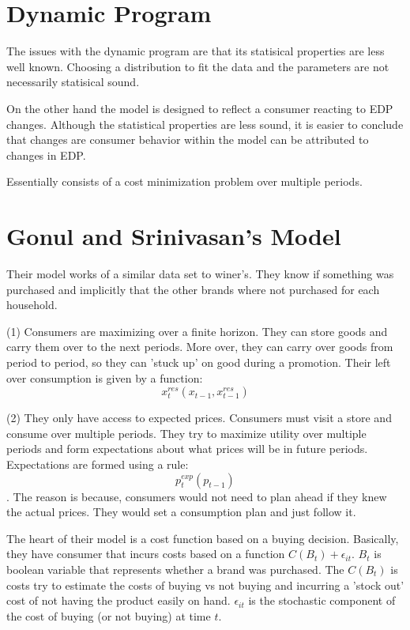 \documentclass{article}
\begin{document}
\section{Dynamic Program}

The issues with the dynamic program are that its statisical properties are less well known. Choosing a distribution to fit the data and the parameters are not necessarily statisical sound.

On the other hand the model is designed to reflect a consumer reacting to EDP changes. Although the statistical properties are less sound, it is easier to conclude that changes are consumer behavior within the model can be attributed to changes in EDP.

Essentially consists of a cost minimization problem over multiple periods.


\section{Gonul and Srinivasan's Model}

Their model works of a similar data set to winer's. They know if something was purchased and implicitly that the other brands where not purchased for each household.

(1) Consumers are maximizing over a finite horizon. They can store goods and carry them over to the next periods. More over, they can carry over goods from period to period, so they can 'stuck up' on good during a promotion. Their left over consumption is given by a function: $$x^{res}_t(x_{t-1},x^{res}_{t-1})$$

(2) They only have access to expected prices. Consumers must visit a store and consume over multiple periods. They try to maximize utility over multiple periods and form expectations about what prices will be in future periods. Expectations are formed using a rule: $$p^{exp}_t(p_{t-1})$$. The reason is because, consumers would not need to plan ahead if they knew the actual prices. They would set a consumption plan and just follow it.

The heart of their model is a cost function based on a buying decision. Basically, they have consumer that incurs costs based on a function $C(B_t) + \epsilon_{it}$. $B_t$ is boolean variable that represents whether a brand was purchased. The $C(B_t)$ is costs try to estimate the costs of buying vs not buying and incurring a 'stock out' cost of not having the product easily on hand. $\epsilon_{it}$ is the stochastic component of the cost of buying (or not buying)
at time $t$.
\end{document}
